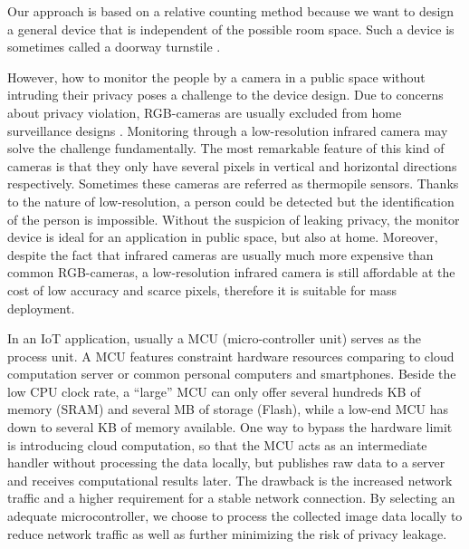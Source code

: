 Our approach is based on a relative counting method because we want to design a general device that is independent of the possible room space. Such a device is sometimes called a doorway turnstile \cite{griffiths2017empirical}.

However, how to monitor the people by a camera in a public space without intruding their privacy poses a challenge to the device design. Due to concerns about privacy violation, RGB-cameras are usually excluded from home surveillance designs \cite{privacyconcerns}. Monitoring through a low-resolution infrared camera may solve the challenge fundamentally. The most remarkable feature of this kind of cameras is that they only have several pixels in vertical and horizontal directions respectively. Sometimes these cameras are referred as thermopile sensors. Thanks to the nature of low-resolution, a person could be detected but the identification of the person is impossible. Without the suspicion of leaking privacy, the monitor device is ideal for an application in public space, but also at home. Moreover, despite the fact that infrared cameras are usually much more expensive than common RGB-cameras, a low-resolution infrared camera is still affordable at the cost of low accuracy and scarce pixels, therefore it is suitable for mass deployment.

In an IoT application, usually a MCU (micro-controller unit) serves as the process unit. A MCU features constraint hardware resources comparing to cloud computation server or common personal computers and smartphones. Beside the low CPU clock rate, a ``large'' MCU can only offer several hundreds KB of memory (SRAM) and several MB of storage (Flash), while a low-end MCU has down to several KB of memory available. One way to bypass the hardware limit is introducing cloud computation, so that the MCU acts as an intermediate handler without processing the data locally, but publishes raw data to a server and receives computational results later. The drawback is the increased network traffic and a higher requirement for a stable network connection. By selecting an adequate microcontroller, we choose to process the collected image data locally to reduce network traffic as well as further minimizing the risk of privacy leakage.

